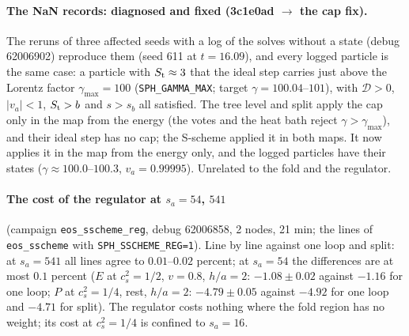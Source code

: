 \documentclass[11pt,aps,preprint,nofootinbib,superscriptaddress,tightenlines]{revtex4-2}
\let\oldparagraph\paragraph
\renewcommand{\paragraph}{\par\bigskip\oldparagraph}
\begin{document}
\paragraph{The NaN records: diagnosed and fixed (3c1e0ad $\to$ the cap fix).}  The reruns of three affected seeds with a log of the solves without a
state (debug 62006902) reproduce them (seed 611 at $t=16.09$), and every logged particle is the same case: a particle with $S_{\rm t}\approx3$ that the
ideal step carries just above the Lorentz factor $\gamma_{\max}=100$ (\texttt{SPH\_GAMMA\_MAX}; target $\gamma=100.04$--$101$), with $\mathcal D>0$,
$|v_a|<1$, $S_{\rm t}>b$ and $s>s_b$ all satisfied.  The tree level and split apply the cap only in the map from the energy (the votes and the heat
bath reject $\gamma>\gamma_{\max}$), and their ideal step has no cap; the S-scheme applied it in both maps.  It now applies it in the map from the
energy only, and the logged particles have their states ($\gamma\approx100.0$--$100.3$, $v_a=0.99995$).  Unrelated to the fold and the regulator.

\paragraph{The cost of the regulator at $s_a=54$, $541$} (campaign \texttt{eos\_sscheme\_reg}, debug 62006858, 2 nodes, 21 min; the lines of
\texttt{eos\_sscheme} with \texttt{SPH\_SSCHEME\_REG=1}).  Line by line against one loop and split: at $s_a=541$ all lines agree to $0.01$--$0.02$
percent; at $s_a=54$ the differences are at most $0.1$ percent ($E$ at $c_s^2=1/2$, $v=0.8$, $h/a=2$: $-1.08\pm0.02$ against $-1.16$ for one loop;
$P$ at $c_s^2=1/4$, rest, $h/a=2$: $-4.79\pm0.05$ against $-4.92$ for one loop and $-4.71$ for split).  The regulator costs nothing where the fold region has
no weight; its cost at $c_s^2=1/4$ is confined to $s_a=16$.
\end{document}
